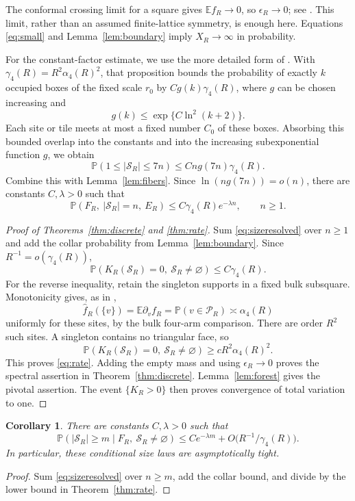 \documentclass[11pt]{amsart}
\newtheorem{corollary}[theorem]{Corollary}
\theoremstyle{remark}
\newcommand{\Prob}{\mathbb P}
\newcommand{\E}{\mathbb E}
\newcommand{\cS}{\mathcal S}
\newcommand{\cP}{\mathcal P}
\begin{document}
The conformal crossing limit for a square gives $\E f_R\to0$, so $\epsilon_R\to0$; see \cite{Smirnov}. This limit, rather than an assumed finite-lattice symmetry, is enough here. Equations \eqref{eq:small} and Lemma~\ref{lem:boundary} imply $X_R\to\infty$ in probability.

For the constant-factor estimate, we use the more detailed form of \cite[Proposition~4.1]{GPS}. With $\gamma_4(R)=R^2\alpha_4(R)^2$, that proposition bounds the probability of exactly $k$ occupied boxes of the fixed scale $r_0$ by $C g(k)\gamma_4(R)$, where $g$ can be chosen increasing and
\[
 g(k)\le\exp\{C\ln^2(k+2)\}.
\]
Each site or tile meets at most a fixed number $C_0$ of these boxes. Absorbing this bounded overlap into the constants and into the increasing subexponential function $g$, we obtain
\begin{equation}\label{eq:gpssize}
 \Prob(1\le|\cS_R|\le7n)\le Cn g(7n)\gamma_4(R).
\end{equation}
Combine this with Lemma~\ref{lem:fibers}. Since $\ln(ng(7n))=o(n)$, there are constants $C,\lambda>0$ such that
\begin{equation}\label{eq:sizeresolved}
 \Prob(F_R,\ |\cS_R|=n,\ E_R)
 \le C\gamma_4(R)e^{-\lambda n},\qquad n\ge1.
\end{equation}

\begin{proof}[Proof of Theorems~\ref{thm:discrete} and \ref{thm:rate}]
Sum \eqref{eq:sizeresolved} over $n\ge1$ and add the collar probability from Lemma~\ref{lem:boundary}. Since $R^{-1}=o(\gamma_4(R))$,
\[
 \Prob(K_R(\cS_R)=0,\ \cS_R\ne\varnothing)\le C\gamma_4(R).
\]
For the reverse inequality, retain the singleton supports in a fixed bulk subsquare. Monotonicity gives, as in \cite[equation~(3.6)]{GPS},
\[
 \widehat f_R(\{v\})=\E\partial_vf_R
 =\Prob(v\in\cP_R)\asymp\alpha_4(R)
\]
uniformly for these sites, by the bulk four-arm comparison. There are order $R^2$ such sites. A singleton contains no triangular face, so
\[
 \Prob(K_R(\cS_R)=0,\ \cS_R\ne\varnothing)
 \ge c R^2\alpha_4(R)^2.
\]
This proves \eqref{eq:rate}. Adding the empty mass and using $\epsilon_R\to0$ proves the spectral assertion in Theorem~\ref{thm:discrete}. Lemma~\ref{lem:forest} gives the pivotal assertion. The event $\{K_R>0\}$ then proves convergence of total variation to one.
\end{proof}

\begin{corollary}\label{cor:conditionalsize}
There are constants $C,\lambda>0$ such that
\[
 \Prob(|\cS_R|\ge m\mid F_R,\ \cS_R\ne\varnothing)
 \le C e^{-\lambda m}+O\bigl(R^{-1}/\gamma_4(R)\bigr).
\]
In particular, these conditional size laws are asymptotically tight.
\end{corollary}
\begin{proof}
Sum \eqref{eq:sizeresolved} over $n\ge m$, add the collar bound, and divide by the lower bound in Theorem~\ref{thm:rate}.
\end{proof}
\end{document}

